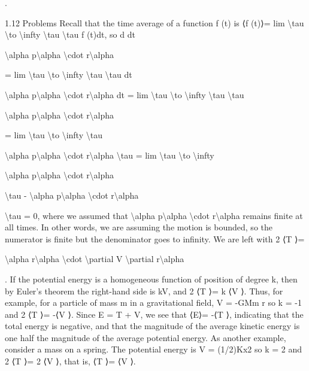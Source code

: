 \begin{exercise}
.

1.12
Problems
Recall that the time average of a function f (t) is
⟨f (t)⟩= lim
\textbackslash{}tau \textbackslash{}to \textbackslash{}infty
\textbackslash{}tau
\textbackslash{}tau
f (t)dt,
so d
dt

\textbackslash{}alpha
p\textbackslash{}alpha  \textbackslash{}cdot  r\textbackslash{}alpha

= lim
\textbackslash{}tau \textbackslash{}to \textbackslash{}infty
\textbackslash{}tau
\textbackslash{}tau
dt

\textbackslash{}alpha
p\textbackslash{}alpha  \textbackslash{}cdot  r\textbackslash{}alpha dt = lim
\textbackslash{}tau \textbackslash{}to \textbackslash{}infty
\textbackslash{}tau
\textbackslash{}tau

\textbackslash{}alpha
p\textbackslash{}alpha  \textbackslash{}cdot  r\textbackslash{}alpha

= lim
\textbackslash{}tau \textbackslash{}to \textbackslash{}infty
\textbackslash{}tau

\textbackslash{}alpha
p\textbackslash{}alpha  \textbackslash{}cdot  r\textbackslash{}alpha
\textbackslash{}tau
= lim
\textbackslash{}tau \textbackslash{}to \textbackslash{}infty

\textbackslash{}alpha
p\textbackslash{}alpha  \textbackslash{}cdot  r\textbackslash{}alpha

\textbackslash{}tau
-
\textbackslash{}alpha
p\textbackslash{}alpha  \textbackslash{}cdot  r\textbackslash{}alpha

\textbackslash{}tau
= 0,
where we assumed that
\textbackslash{}alpha
p\textbackslash{}alpha  \textbackslash{}cdot  r\textbackslash{}alpha  remains finite at all times. In other words,
we are assuming the motion is bounded, so the numerator is finite but the
denominator goes to infinity.
We are left with
2 ⟨T ⟩=

\textbackslash{}alpha
r\textbackslash{}alpha  \textbackslash{}cdot  \textbackslash{}partial V
\textbackslash{}partial r\textbackslash{}alpha

.
If the potential energy is a homogeneous function of position of degree k, then
by Euler's theorem the right-hand side is kV, and
2 ⟨T ⟩= k ⟨V ⟩.
Thus, for example, for a particle of mass m in a gravitational field,
V = -GMm
r
so k = -1 and
2 ⟨T ⟩= -⟨V ⟩.
Since E = T + V, we see that ⟨E⟩= -⟨T ⟩, indicating that the total energy is
negative, and that the magnitude of the average kinetic energy is one half the
magnitude of the average potential energy.
As another example, consider a mass on a spring. The potential energy is
V = (1/2)Kx2 so k = 2 and 2 ⟨T ⟩= 2 ⟨V ⟩, that is, ⟨T ⟩= ⟨V ⟩.
\end{exercise}

